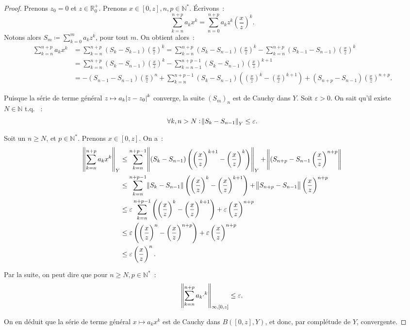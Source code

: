 \documentclass{report}
\theoremstyle{definition}
\theoremstyle{remark}
\newcommand{\R}{\mathbb R}
\newcommand{\Rp}{\R^{+}}
\newcommand{\N}{\mathbb N}
\newcommand{\Ns}{\N^{*}}
\newcommand{\tq}{\text{ t.q. }}
\begin{document}
			\begin{proof} Prenons $z_0 = 0$ et $z \in \Rp_0$. Prenons $x \in [0, z], n, p \in \Ns$. Écrivons~:
			\[\sum_{k=n}^{n+p}a_kx^k = \sum_{n=0}^{n+p}a_kz^k\left(\frac xz\right)^k.\]
			Notons alors $S_m \coloneqq \sum_{k=0}^ma_kz^k$, pour tout $m$. On obtient alors~:
			\begin{align*}
				\sum_{k=n}^{n+p}a_kx^k &= \sum_{k=n}^{n+p}(S_k - S_{k-1})\left(\frac xz\right)^k
					= \sum_{k=n}^{n+p}(S_k - S_{n-1})\left(\frac xz\right)^k - \sum_{k=n}^{n+p}(S_{k-1} - S_{n-1})\left(\frac xz\right)^k \\
				&= \sum_{k=n}^{n+p}(S_k-S_{n-1})\left(\frac xz\right)^k - \sum_{k=n-1}^{n+p-1}(S_k-S_{n-1})\left(\frac xz\right)^{k+1} \\
				&= -(S_{n-1}-S_{n-1})\left(\frac xz\right)^n + \sum_{k=n}^{n+p-1}(S_k-S_{n-1})\left(\left(\frac xz\right)^k - \left(\frac xz\right)^{k+1}\right)
					+ (S_{n+p}-S_{n-1})\left(\frac xz\right)^{n+p}.
			\end{align*}

			Puisque la série de terme général $z \mapsto a_k\abs {z-z_0}^k$ converge, la suite $(S_m)_n$ est de Cauchy dans $Y$. Soit $\varepsilon > 0$. On sait
			qu'il existe $N \in \N \tq$~:
			\[\forall k, n > N : \norm {S_k - S_{n-1}}_Y \leq \varepsilon.\]

			Soit un $n \geq N$, et $p \in \Ns$. Prenons $x \in [0, z]$. On a~:
			\begin{align*}
				\norm {\sum_{k=n}^{n+p}a_kx^k}_Y &\leq \sum_{k=n}^{n+p-1}\norm {(S_k-S_{n-1})\left(\left(\frac xz\right)^{k+1} - \left(\frac xz\right)^k\right)}_Y
					+ \norm {(S_{n+p}-S_{n-1}\left(\frac xz\right)^{n+p}} \\
				&\leq \sum_{k=n}^{n+p-1}\norm {S_k - S_{n-1}}\left(\left(\frac xz\right)^k - \left(\frac xz\right)^{k+1}\right)
					+ \norm {S_{n+p}-S_{n-1}}\left(\frac xz\right)^{n+p} \\
				&\leq \varepsilon\sum_{k=n}^{n+p-1}\left(\left(\frac xz\right)^k - \left(\frac xz\right)^{k+1}\right) + \varepsilon\left(\frac xz\right)^{n+p} \\
				&\leq \varepsilon\left(\left(\frac xz\right)^n - \left(\frac xz\right)^{n+p}\right) + \varepsilon\left(\frac xz\right)^{n+p} \\
				&\leq \varepsilon\left(\frac xz\right)^{n}.
			\end{align*}

			Par la suite, on peut dire que pour $n \geq N, p \in \Ns$~:
			\[\norm {\sum_{k=n}^{n+p}a_k \cdot^k}_{\infty, [0, z]} \leq \varepsilon.\]

			On en déduit que la série de terme général $x \mapsto a_kx^k$ est de Cauchy dans $B([0, z], Y)$, et donc, par complétude de $Y$, convergente.
			\end{proof}
\end{document}

